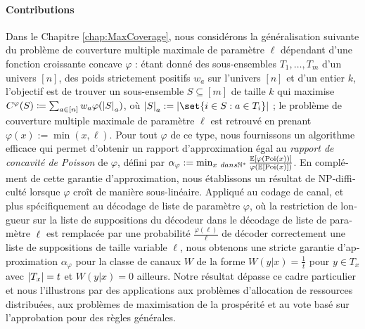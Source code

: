 \begin{otherlanguage}{french}
\paragraph{Contributions} Dans le Chapitre \ref{chap:MaxCoverage}, nous considérons la généralisation suivante du problème de couverture multiple maximale de paramètre $\ell$ dépendant d'une fonction croissante concave $\varphi$ : étant donné des sous-ensembles $T_1, \ldots, T_m$ d'un univers $[n]$, des poids strictement positifs $w_a$ sur l'univers $[n]$ et d'un entier $k$, l'objectif est de trouver un sous-ensemble $S \subseteq [m]$ de taille $k$ qui maximise $C^{\varphi}(S) \coloneqq \sum_{a \in [n]}w_a\varphi(\abs{S}_a)$, où $\abs{S}_a : = \abs{\set{i \in S : a \in T_i}}$ ; le problème de couverture multiple maximale de paramètre $\ell$ est retrouvé en prenant $\varphi(x) := \min(x,\ell)$. Pour tout $\varphi$ de ce type, nous fournissons un algorithme efficace qui permet d'obtenir un rapport d'approximation égal au \emph{rapport de concavité de Poisson} de $\varphi$, défini par $\alpha_{\varphi} := \min_{x \ dans \mathbb{N}^*} \frac{\mathbb{E}[\varphi(\operatorname{\text{Poi}}(x))]}{\varphi(\mathbb{E}[\operatorname{\text{Poi}}(x)])}$. En complément de cette garantie d'approximation, nous établissons un résultat de \textrm{NP}-difficulté lorsque $\varphi$ croît de manière sous-linéaire. Appliqué au codage de canal, et plus spécifiquement au décodage de liste de paramètre $\varphi$, où la restriction de longueur sur la liste de suppositions du décodeur dans le décodage de liste de paramètre $\ell$ est remplacée par une probabilité $\frac{\varphi(\ell)}{\ell}$ de décoder correctement une liste de suppositions de taille variable $\ell$, nous obtenons une stricte garantie d'approximation $\alpha_{\varphi}$ pour la classe de canaux $W$ de la forme $W(y|x) = \frac{1}{t}$ pour $y \in T_x$ avec $\abs{T_x}=t$ et $W(y|x) = 0$ ailleurs. Notre résultat dépasse ce cadre particulier et nous l'illustrons par des applications aux problèmes d'allocation de ressources distribuées, aux problèmes de maximisation de la prospérité et au vote basé sur l'approbation pour des règles générales.


\end{otherlanguage}
